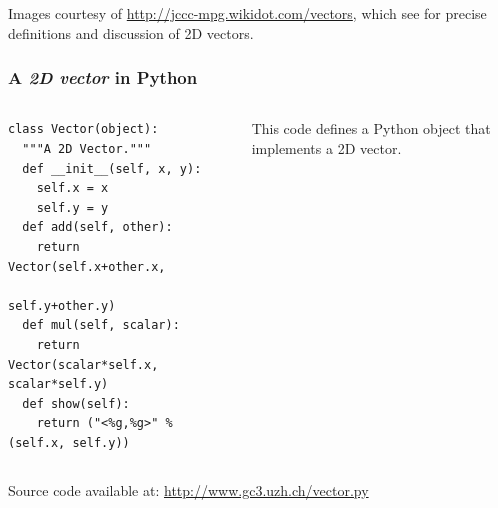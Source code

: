 \documentclass[english,serif,mathserif,xcolor=pdftex,dvipsnames,table]{beamer}
\begin{document}
\begin{frame}
  \begin{references}
    \tiny
    Images courtesy of \url{http://jccc-mpg.wikidot.com/vectors},
    which see for precise definitions and discussion of 2D vectors.
  \end{references}
\end{frame}


\begin{frame}[fragile]
  \frametitle{A \emph{2D vector} in Python}
  \begin{columns}[t]
    \begin{column}{0.5\textwidth}
\begin{lstlisting}
class Vector(object):
  """A 2D Vector."""
  def __init__(self, x, y):
    self.x = x
    self.y = y
  def add(self, other):
    return Vector(self.x+other.x,
                  self.y+other.y)
  def mul(self, scalar):
    return Vector(scalar*self.x, scalar*self.y)
  def show(self):
    return ("<%g,%g>" % (self.x, self.y))
\end{lstlisting}
    \end{column}
    \begin{column}{0.5\textwidth}
      \raggedleft
      This code defines a Python object that implements a 2D vector.
    \end{column}
  \end{columns}

  \+
  {\scriptsize Source code available at:
    \url{http://www.gc3.uzh.ch/vector.py}}
\end{frame}
\end{document}
